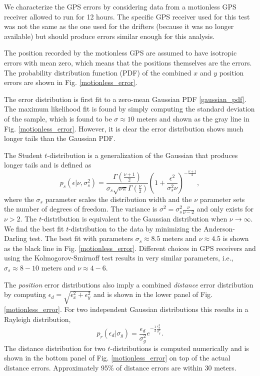 \documentclass{ametsoc}
\begin{document}
We characterize the GPS errors by considering data from a motionless GPS receiver allowed to run for 12 hours. The specific GPS receiver used for this test was not the same as the one used for the drifters (because it was no longer available) but should produce errors similar enough for this analysis.

The position recorded by the motionless GPS are assumed to have isotropic errors with mean zero, which means that the positions themselves are the errors. The probability distribution function (PDF) of the combined $x$ and $y$ position errors are shown in Fig. \ref{motionless_error}.

The error distribution is first fit to a zero-mean Gaussian PDF \eqref{gaussian_pdf}.
The maximum likelihood fit is found by simply computing the standard deviation of the sample, which is found to be $\sigma \approx 10$ meters and shown as the gray line in Fig. \ref{motionless_error}. However, it is clear the error distribution shows much longer tails than the Gaussian PDF.

The Student $t$-distribution is a generalization of the Gaussian that produces longer tails and is defined as 
\begin{equation}
\label{student_pdf}
p_s\left(\epsilon |\nu,\sigma_s^2\right) = \frac{\Gamma\left( \frac{\nu + 1}{2} \right)}{\sigma_s \sqrt{\nu \pi} \Gamma\left(\frac{\nu}{2}\right)} \left( 1 + \frac{\epsilon^2}{\sigma_s^2 \nu} \right)^{-\frac{\nu+1}{2}},
\end{equation}
where the $\sigma_s$ parameter scales the distribution width and the $\nu$ parameter sets the number of degrees of freedom. The variance is $\sigma^2=\sigma_s^2 \frac{\nu}{\nu-2}$ and only exists for $\nu > 2$. The $t$-distribution is equivalent to the Gaussian distribution when $\nu \rightarrow \infty$. We find the best fit $t$-distribution to the data by minimizing the Anderson-Darling test. The best fit with parameters $\sigma_s \approx 8.5$ meters and $\nu \approx 4.5$ is shown as the black line in Fig. \ref{motionless_error}. Different choices in GPS receivers and using the Kolmogorov-Smirnoff test results in very similar parameters, i.e., $\sigma_s\approx8-10$ meters and $\nu\approx4-6$.

The \emph{position} error distributions also imply a combined \emph{distance} error distribution by computing $\epsilon_d = \sqrt{\epsilon_x^2 + \epsilon_y^2}$ and is shown in the lower panel of Fig. \ref{motionless_error}. For two independent Gaussian distributions this results in a Rayleigh distribution,
\begin{equation}
\label{rayleigh_pdf}
p_r(\epsilon_d|\sigma_g) = \frac{\epsilon_d}{\sigma_g^2 } e^{-\frac{1}{2}\frac{\epsilon_d^2}{\sigma_g^2}}.
\end{equation}
The distance distribution for two $t$-distributions is computed numerically and is shown in the bottom panel of Fig. \ref{motionless_error} on top of the actual distance errors. Approximately 95\% of distance errors are within $30$ meters.
\end{document}
